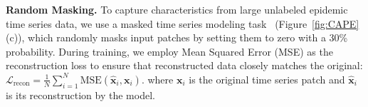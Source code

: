 

\noindent\textbf{Random Masking.} To capture characteristics from large unlabeled epidemic time series data, we use a masked time series modeling task~\cite{kamarthi2023pems, goswami2024moment} (Figure~\ref{fig:CAPE}(c)), which randomly masks input patches by setting them to zero with a 30\% probability. During training, we employ Mean Squared Error (MSE) as the reconstruction loss to ensure that reconstructed data closely matches the original: $\mathcal{L}_{\text{recon}} = \frac{1}{N}\sum_{i=1}^{N} \text{MSE}(\hat{\mathbf{x}}_i, \mathbf{x}_i)$.
where \( \mathbf{x}_i \) is the original time series patch and \( \hat{\mathbf{x}}_i \) is its reconstruction by the model.



